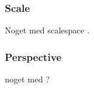 \documentclass[../thesis.tex]{subfiles}
\begin{document}
\subsubsection{Scale}
Noget med scalespace \cite{griffin1997scale}.

\subsubsection{Perspective}
noget med ?

%
%
%
%
%
%
%
%

\subbibliography
\end{document}
